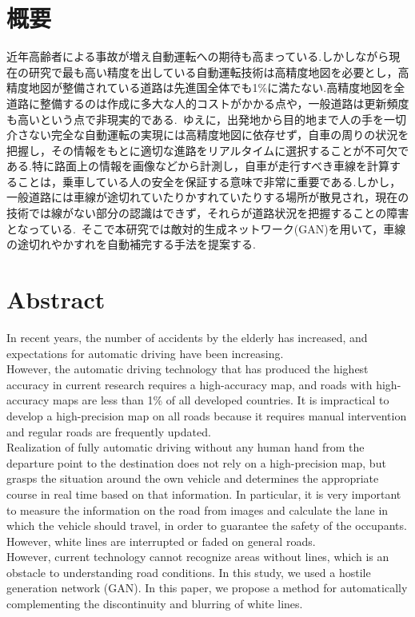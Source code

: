 \documentclass[a4j, 11pt]{jreport}
\begin{document}
\section*{概要}
 近年高齢者による事故が増え自動運転への期待も高まっている.しかしながら現在の研究で最も高い精度を出している自動運転技術は高精度地図を必要とし，高精度地図が整備されている道路は先進国全体でも1\%に満たない.高精度地図を全道路に整備するのは作成に多大な人的コストがかかる点や，一般道路は更新頻度も高いという点で非現実的である. ゆえに，出発地から目的地まで人の手を一切介さない完全な自動運転の実現には高精度地図に依存せず，自車の周りの状況を把握し，その情報をもとに適切な進路をリアルタイムに選択することが不可欠である.特に路面上の情報を画像などから計測し，自車が走行すべき車線を計算することは，乗車している人の安全を保証する意味で非常に重要である.しかし，一般道路には車線が途切れていたりかすれていたりする場所が散見され，現在の技術では線がない部分の認識はできず，それらが道路状況を把握することの障害となっている. そこで本研究では敵対的生成ネットワーク(GAN)を用いて，車線の途切れやかすれを自動補完する手法を提案する.
\section*{Abstract}
In recent years, the number of accidents by the elderly has increased, and expectations for automatic driving have been increasing. \\
\indent However, the automatic driving technology that has produced the highest accuracy in current research requires a high-accuracy map, and roads with high-accuracy maps are less than 1\% of all developed countries. It is impractical to develop a high-precision map on all roads because it requires manual intervention and regular roads are frequently updated.\\
\indent Realization of fully automatic driving without any human hand from the departure point to the destination does not rely on a high-precision map, but grasps the situation around the own vehicle and determines the appropriate course in real time based on that information. In particular, it is very important to measure the information on the road from images and calculate the lane in which the vehicle should travel, in order to guarantee the safety of the occupants. However, white lines are interrupted or faded on general roads. \\
\indent However, current technology cannot recognize areas without lines, which is an obstacle to understanding road conditions. In this study, we used a hostile generation network (GAN). In this paper, we propose a method for automatically complementing the discontinuity and blurring of white lines.
\end{document}
